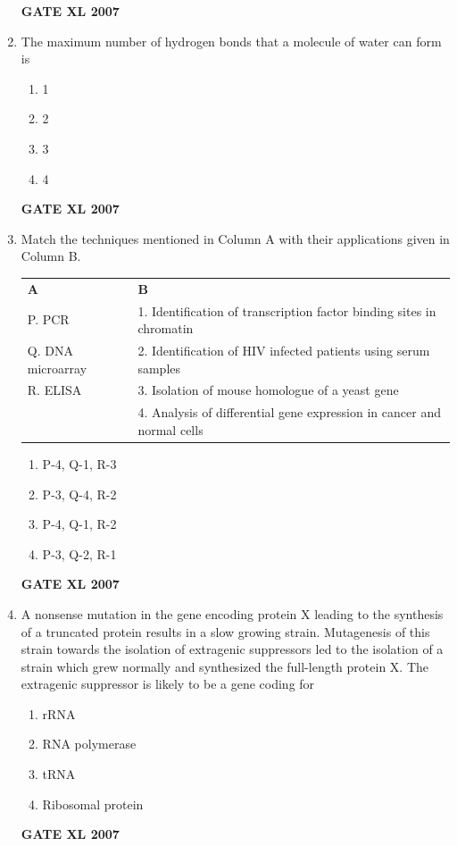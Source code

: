 \documentclass[journal,12pt,onecolumn]{IEEEtran}
\begin{document}
\begin{enumerate}
	    \hfill \textbf{GATE XL 2007}
    \item The maximum number of hydrogen bonds that a molecule of water can form is 
    \begin{multicols}{4}
        \begin{enumerate} 
            \item 1
            \item 2
            \item 3
            \item 4
        \end{enumerate}
    \end{multicols}
	    \hfill \textbf{GATE XL 2007}

    \item Match the techniques mentioned in Column A with their applications given in Column B. 
    

	    \begin{tabularx}{\textwidth}{@{}lX@{}}
        \textbf{A} & \textbf{B} \\
        P. PCR & 1. Identification of transcription factor binding sites in chromatin \\
        Q. DNA microarray & 2. Identification of HIV infected patients using serum samples \\
        R. ELISA & 3. Isolation of mouse homologue of a yeast gene \\
        & 4. Analysis of differential gene expression in cancer and normal cells \\
    \end{tabularx}
        \begin{enumerate} 
            \item P-4, Q-1, R-3
            \item P-3, Q-4, R-2
            \item P-4, Q-1, R-2
            \item P-3, Q-2, R-1
        \end{enumerate}
	    \hfill \textbf{GATE XL 2007}

    \item A nonsense mutation in the gene encoding protein X leading to the synthesis of a truncated protein results in a slow growing strain. Mutagenesis of this strain towards the isolation of extragenic suppressors led to the isolation of a strain which grew normally and synthesized the full-length protein X. The extragenic suppressor is likely to be a gene coding for 
    \begin{multicols}{2}
        \begin{enumerate} 
            \item rRNA
            \item RNA polymerase
            \item tRNA
            \item Ribosomal protein
        \end{enumerate}
    \end{multicols}
	    \hfill \textbf{GATE XL 2007}


\end{enumerate}
\end{document}
